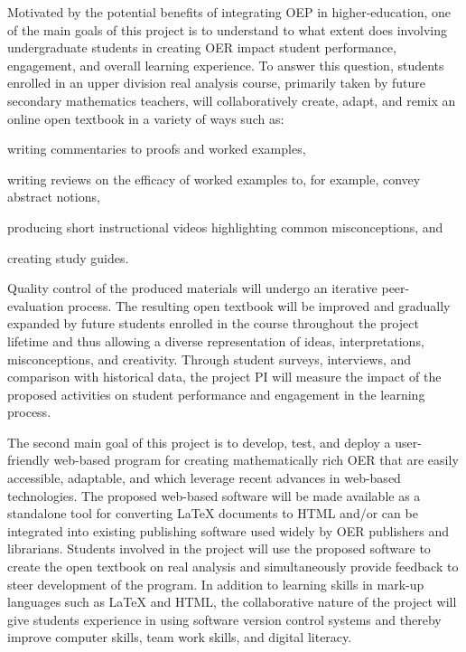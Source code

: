 \documentclass[11pt]{article}
\begin{document}
Motivated by the potential benefits of integrating OEP in higher-education, one of the main goals of this project is to understand to what extent does involving undergraduate students in creating OER impact student performance, engagement, and overall learning experience.  To answer this question, students enrolled in an upper division real analysis course, primarily taken by future secondary mathematics teachers, will collaboratively create, adapt, and remix an online open textbook in a variety of ways such as:
\begin{compactitem}
\item writing commentaries to proofs and worked examples, 
\item writing reviews on the efficacy of worked examples to, for example, convey abstract notions,
\item producing short instructional videos highlighting common misconceptions, and 
\item creating study guides.
\end{compactitem}
Quality control of the produced materials will undergo an iterative peer-evaluation process.  The resulting open textbook will be improved and gradually expanded by future students enrolled in the course throughout the project lifetime and thus allowing a diverse representation of ideas, interpretations, misconceptions, and creativity.  Through student surveys, interviews, and comparison with historical data, the project PI will measure the impact of the proposed activities on student performance and engagement in the learning process.  

The second main goal of this project is to develop, test, and deploy a user-friendly web-based program for creating mathematically rich OER that are easily accessible, adaptable, and which leverage recent advances in web-based technologies.  The proposed web-based software will be made available as a standalone tool for converting LaTeX documents to HTML and/or can be integrated into existing publishing software used widely by OER publishers and librarians.  Students involved in the project will use the proposed software to create the open textbook on real analysis and simultaneously provide feedback to steer development of the program.  In addition to learning skills in mark-up languages such as LaTeX and HTML, the collaborative nature of the project will give students experience in using software version control systems and thereby improve computer skills, team work skills, and digital literacy.
\end{document}
